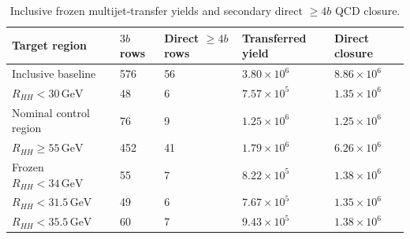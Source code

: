 \begin{table}[tb]
  \centering
  \footnotesize
  \caption{Inclusive frozen multijet-transfer yields and secondary direct $\geq4b$ QCD closure.}
  \label{tab:transfer-closure-yields}
  \begin{tabular}{lllll}
    \toprule
    Target region & $3b$ rows & Direct $\geq4b$ rows & Transferred yield & Direct closure \\
    \midrule
    Inclusive baseline & 576 & 56 & $3.80\times10^{6}$ & $8.86\times10^{6}$ \\
    $R_{HH}<30\,\mathrm{GeV}$ & 48 & 6 & $7.57\times10^{5}$ & $1.35\times10^{6}$ \\
    Nominal control region & 76 & 9 & $1.25\times10^{6}$ & $1.25\times10^{6}$ \\
    $R_{HH}\geq55\,\mathrm{GeV}$ & 452 & 41 & $1.79\times10^{6}$ & $6.26\times10^{6}$ \\
    Frozen $R_{HH}<34\,\mathrm{GeV}$ & 55 & 7 & $8.22\times10^{5}$ & $1.38\times10^{6}$ \\
    $R_{HH}<31.5\,\mathrm{GeV}$ & 49 & 6 & $7.67\times10^{5}$ & $1.35\times10^{6}$ \\
    $R_{HH}<35.5\,\mathrm{GeV}$ & 60 & 7 & $9.43\times10^{5}$ & $1.38\times10^{6}$ \\
    \bottomrule
  \end{tabular}
\end{table}
